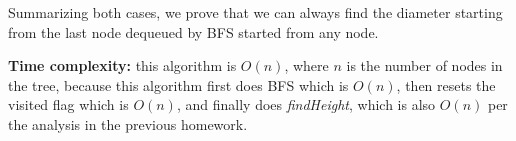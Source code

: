 \documentclass{article}
\begin{document}
\begin{description}
  Summarizing both cases, we prove that we can always find the diameter starting from the last node dequeued by BFS started from any node.

  \textbf{Time complexity:} this algorithm is $O(n)$, where $n$ is the number of nodes in the tree, because this algorithm first does BFS which is $O(n)$, then resets the visited flag which is $O(n)$, and finally does \textit{findHeight}, which is also $O(n)$ per the analysis in the previous homework.

\end{description}
\end{document}

